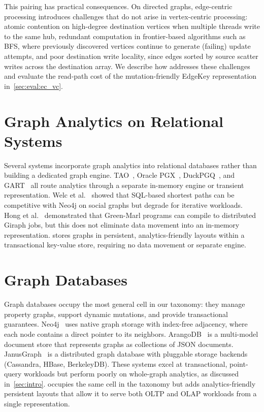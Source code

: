 This pairing has practical consequences.
On directed graphs, edge-centric processing introduces challenges that do not arise in vertex-centric processing: atomic contention on high-degree destination vertices when multiple threads write to the same hub, redundant computation in frontier-based algorithms such as BFS, where previously discovered vertices continue to generate (failing) update attempts, and poor destination write locality, since edges sorted by source scatter writes across the destination array.
We describe how \project{} addresses these challenges and evaluate the read-path cost of the mutation-friendly EdgeKey representation in~\autoref{sec:eval:ec_vc}.

\section{Graph Analytics on Relational Systems}
\label{design:relational_analytics}
Several systems incorporate graph analytics into relational databases rather than building a dedicated graph engine.
TAO~\cite{bronson2013tao}, Oracle PGX~\cite{hong2015pgx,OraclePG,WhatIsOracleSpatialGraph:online}, DuckPGQ~\cite{duckpgq:online}, and GART~\cite{shen2023bridging} all route analytics through a separate in-memory engine or transient representation.
Welc et al.~\cite{welc2013graph,graphProcessingRDBMS} showed that SQL-based shortest paths can be competitive with Neo4j on social graphs but degrade for iterative workloads.
Hong et al.~\cite{hong2013early} demonstrated that Green-Marl programs can compile to distributed Giraph jobs, but this does not eliminate data movement into an in-memory representation.
\project{} stores graphs in persistent, analytics-friendly layouts within a transactional key-value store, requiring no data movement or separate engine.

\section{Graph Databases}
\label{design:graph_databases}
Graph databases occupy the most general cell in our taxonomy: they manage property graphs, support dynamic mutations, and provide transactional guarantees.
Neo4j~\cite{neo4j} uses native graph storage with index-free adjacency, where each node contains a direct pointer to its neighbors.
ArangoDB~\cite{arangodb} is a multi-model document store that represents graphs as collections of JSON documents.
JanusGraph~\cite{janusgraph} is a distributed graph database with pluggable storage backends (Cassandra, HBase, BerkeleyDB).
These systems excel at transactional, point-query workloads but perform poorly on whole-graph analytics, as discussed in~\autoref{sec:intro}.
\project{} occupies the same cell in the taxonomy but adds analytics-friendly persistent layouts that allow it to serve both OLTP and OLAP workloads from a single representation.


